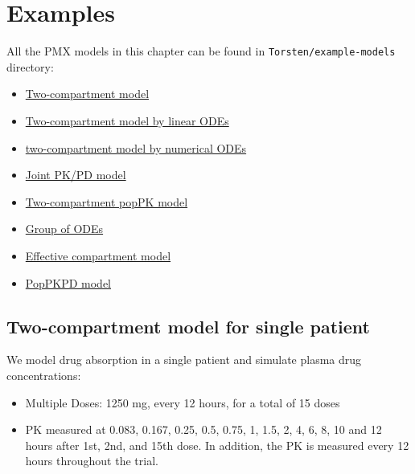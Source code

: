 \documentclass[12pt, reqno, oneside]{amsbook}
\numberwithin{equation}{chapter}
\numberwithin{figure}{chapter}
\numberwithin{table}{chapter}
\theoremstyle{remark}
\begin{document}
\chapter{Examples}
\label{sec:org5ad4b3a}
All the PMX models in this chapter can be found in
\texttt{Torsten/example-models} directory:
\begin{itemize}
\item \href{https://github.com/metrumresearchgroup/Torsten/tree/master/example-models/pk2cpt}{Two-compartment model}
\item \href{https://github.com/metrumresearchgroup/Torsten/tree/master/example-models/pk2cpt\_linode}{Two-compartment model by linear ODEs}
\item \href{https://github.com/metrumresearchgroup/Torsten/tree/master/example-models/pk2cpt\_ode}{two-compartment model by numerical ODEs}
\item \href{https://github.com/metrumresearchgroup/Torsten/tree/master/example-models/FK\_coupled}{Joint PK/PD model}
\item \href{https://github.com/metrumresearchgroup/Torsten/tree/master/example-models/twocpt\_population}{Two-compartment popPK model}
\item \href{https://github.com/metrumresearchgroup/Torsten/tree/master/example-models/lotka\_volterra\_ode\_group\_model}{Group of ODEs}
\item \href{https://github.com/metrumresearchgroup/Torsten/tree/master/example-models/effCpt}{Effective compartment model}
\item \href{https://github.com/metrumresearchgroup/Torsten/tree/master/example-models/FribergKarlsson}{PopPKPD model}
\end{itemize}

\section{Two-compartment model for single patient}
\label{sec:org4b8e202}
We model drug absorption in a single patient and simulate plasma drug concentrations:

\begin{itemize}
\item Multiple Doses: 1250 mg, every 12 hours, for a total of 15 doses
\item PK measured at 0.083, 0.167, 0.25, 0.5, 0.75, 1, 1.5, 2, 4, 6,
8, 10 and 12 hours after 1st, 2nd, and 15th dose. In addition, the
PK is measured every 12 hours throughout the trial.
\end{itemize}
\end{document}
